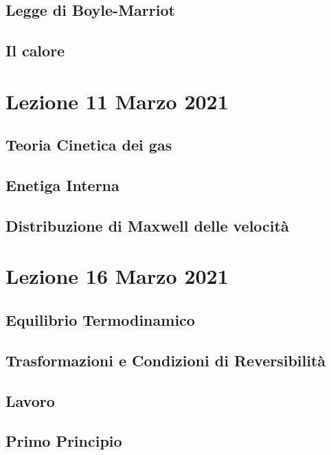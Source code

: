 \documentclass[a4paper]{article}
\theoremstyle{definition}
\theoremstyle{plain}
\begin{document}
\subsection {Legge di Boyle-Marriot}

\subsection {Il calore}
\section{Lezione 11 Marzo 2021}

\subsection {Teoria Cinetica dei gas}

\subsection {Enetiga Interna}

\subsection {Distribuzione di Maxwell delle velocità}

\section{Lezione 16 Marzo 2021}

\subsection{Equilibrio Termodinamico}

\subsection {Trasformazioni e Condizioni di Reversibilità}

\subsection{Lavoro}

\subsection {Primo Principio}
\end{document}
